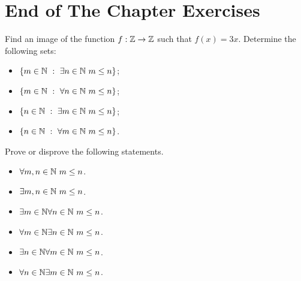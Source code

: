 \section*{End of The Chapter Exercises}
\begin{exercises}
  \exercise Find an image of the function $f : \mathbb{Z} \to \mathbb{Z}$ such that
    $f(x) = 3x$.
  \exercise Determine the following sets:
    \begin{itemize}
      \item $\set[\exists n \in \N \ m \le n]{m \in \N}$;
      \item $\set[\forall n \in \N \ m \le n]{m \in \N}$;
      \item $\set[\exists m \in \N \ m \le n]{n \in \N}$;
      \item $\set[\forall m \in \N \ m \le n]{n \in \N}$.
    \end{itemize}
  \exercise Prove or disprove the following statements.
    \begin{itemize}
      \item $\forall m, n \in \mathbb{N} \ m \le n$.
      \item $\exists m, n \in \mathbb{N} \ m \le n$.
      \item $\exists m \in \mathbb{N} \forall n \in \mathbb{N} \ m \le n$.
      \item $\forall m \in \mathbb{N} \exists n \in \mathbb{N} \ m \le n$.
      \item $\exists n \in \mathbb{N} \forall m \in \mathbb{N} \ m \le n$.
      \item $\forall n \in \mathbb{N} \exists m \in \mathbb{N} \ m \le n$.
    \end{itemize}
\end{exercises}
